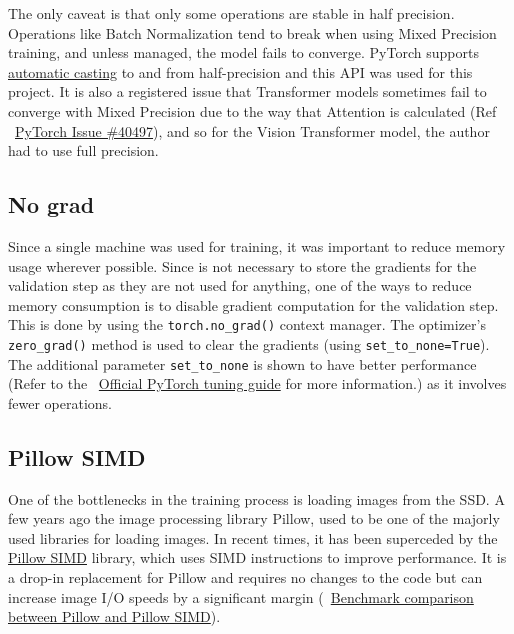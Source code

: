 The only caveat is that only some operations are stable in half precision. Operations like Batch Normalization tend to break when using Mixed Precision training, and unless managed, the model fails to converge. PyTorch supports \href{https://pytorch.org/docs/stable/notes/amp_examples.html}{automatic casting} to and from half-precision and this API was used for this project. It is also a registered issue that Transformer models sometimes fail to converge with Mixed Precision due to the way that Attention is calculated (Ref ~\href{https://github.com/pytorch/pytorch/issues/40497}{PyTorch Issue \#40497}), and so for the Vision Transformer \cite{dosovitskiyImageWorth16x162021} model, the author had to use full precision.

\subsection{No grad}
Since a single machine was used for training, it was important to reduce memory usage wherever possible. Since is not necessary to store the gradients for the validation step as they are not used for anything, one of the ways to reduce memory consumption is to disable gradient computation for the validation step. This is done by using the \texttt{torch.no\_grad()} context manager.  The optimizer's \texttt{zero\_grad()} method is used to clear the gradients (using \texttt{set\_to\_none=True}). The additional parameter \texttt{set\_to\_none} is shown to have better performance (Refer to the ~\href{https://pytorch.org/tutorials/recipes/recipes/tuning_guide.html}{Official PyTorch tuning guide} for more information.) as it involves fewer operations.

\subsection{Pillow SIMD}
One of the bottlenecks in the training process is loading images from the SSD. A few years ago the image processing library Pillow, used to be one of the majorly used libraries for loading images. In recent times, it has been superceded by the \href{https://github.com/uploadcare/pillow-simd}{Pillow SIMD} library, which uses SIMD instructions to improve performance. It is a drop-in replacement for Pillow and requires no changes to the code but can increase image I/O speeds by a significant margin (~\href{https://python-pillow.org/pillow-perf/}{Benchmark comparison between Pillow and Pillow SIMD}). 

